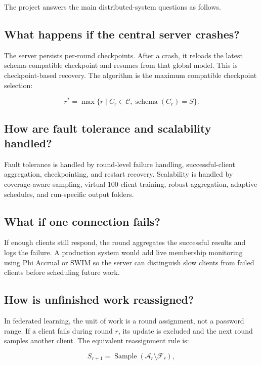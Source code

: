 \documentclass[conference]{IEEEtran}
\begin{document}
The project answers the main distributed-system questions as follows.

\subsection{What happens if the central server crashes?}

The server persists per-round checkpoints. After a crash, it reloads the latest
schema-compatible checkpoint and resumes from that global model. This is
checkpoint-based recovery. The algorithm is the maximum compatible checkpoint
selection:

\begin{equation}
r^*=\max\{r\mid C_r \in \mathcal{C},\operatorname{schema}(C_r)=S\}.
\end{equation}

\subsection{How are fault tolerance and scalability handled?}

Fault tolerance is handled by round-level failure handling, successful-client
aggregation, checkpointing, and restart recovery. Scalability is handled by
coverage-aware sampling, virtual 100-client training, robust aggregation,
adaptive schedules, and run-specific output folders.

\subsection{What if one connection fails?}

If enough clients still respond, the round aggregates the successful results and
logs the failure. A production system would add live membership monitoring using
Phi Accrual or SWIM so the server can distinguish slow clients from failed
clients before scheduling future work.

\subsection{How is unfinished work reassigned?}

In federated learning, the unit of work is a round assignment, not a password
range. If a client fails during round \(r\), its update is excluded and the next
round samples another client. The equivalent reassignment rule is:

\begin{equation}
S_{r+1}=\operatorname{Sample}(\mathcal{A}_r \setminus \mathcal{F}_r),
\end{equation}
\end{document}
